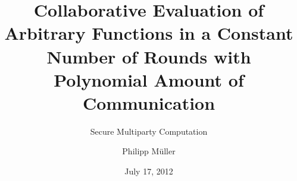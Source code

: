 \documentclass{beamer}
\title{Collaborative Evaluation of Arbitrary Functions in a Constant Number of Rounds with Polynomial Amount of Communication}
\subtitle{Secure Multiparty Computation}
\author[P. Müller]{Philipp Müller}
\institute[TUM]{Technische Universität München}
\date{July 17, 2012}
\begin{document}
\begin{frame}
  \maketitle{}
\end{frame}

\end{document}
